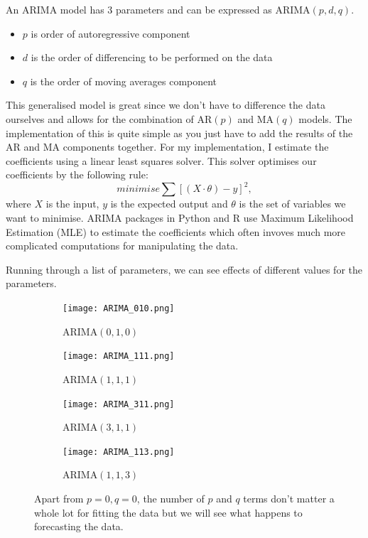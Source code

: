 \documentclass{article}
\begin{document}
  An ARIMA model has 3 parameters and can be expressed as ARIMA$(p,d,q)$.
  \begin{itemize}
    \item $p$ is order of autoregressive component
    \item $d$ is the order of differencing to be performed on the data
    \item $q$ is the order of moving averages component
  \end{itemize}
  This generalised model is great since we don't have to difference the data ourselves and allows for the combination of AR$(p)$ and MA$(q)$ models. The implementation of this is quite simple as you just have to add the results of the AR and MA components together. For my implementation, I estimate the coefficients using a linear least squares solver. This solver optimises our coefficients by the following rule:
  \begin{equation*}
    minimise \sum [(X\cdot\theta) - y]^2,
  \end{equation*}
  where $X$ is the input, $y$ is the expected output and $\theta$ is the set of variables we want to minimise. ARIMA packages in Python and R use Maximum Likelihood Estimation (MLE) to estimate the coefficients which often invoves much more complicated computations for manipulating the data.  

  Running through a list of parameters, we can see effects of different values for the parameters.

  \begin{figure}[H]
    \centering
    \captionsetup{justification=centering}
    \begin{subfigure}[b]{0.49\linewidth}
      \texttt{[image: ARIMA\_010.png]}
      \caption{ARIMA$(0, 1, 0)$}
    \end{subfigure}
    \begin{subfigure}[b]{0.49\linewidth}
      \texttt{[image: ARIMA\_111.png]}
      \caption{ARIMA$(1, 1, 1)$}
    \end{subfigure}
    \begin{subfigure}[b]{0.49\linewidth}
      \texttt{[image: ARIMA\_311.png]}
      \caption{ARIMA$(3, 1, 1)$}
    \end{subfigure}
    \begin{subfigure}[b]{0.49\linewidth}
      \texttt{[image: ARIMA\_113.png]}
      \caption{ARIMA$(1, 1, 3)$}
    \end{subfigure}
    \caption{Apart from $p=0, q=0$, the number of $p$ and $q$ terms don't matter a whole lot for fitting the data but we will see what happens to forecasting the data.}
  \end{figure}
\end{document}
